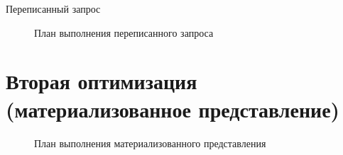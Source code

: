 \begin{algorithm}[H]
  \caption{Переписанный запрос}
  \label{code-task-2-rewritten}
\end{algorithm}


\begin{figure}[H]%
  \caption{План выполнения переписанного запроса}
  \label{fig-task-2-rewrite-plan}
\end{figure}


\section{Вторая оптимизация (материализованное представление)}




\begin{figure}[H]%
  \caption{План выполнения материализованного представления}
  \label{fig-task-2-mview-plan}
\end{figure}

